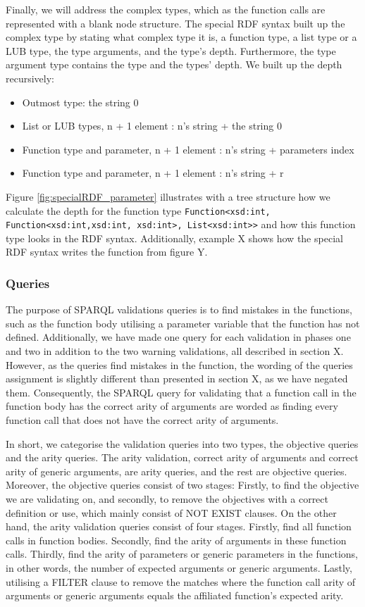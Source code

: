 \para
Finally, we will address the complex types, which as the function calls are represented with a blank node structure. The special RDF syntax built up the complex type by stating what complex type it is, a function type, a list type or a LUB type, the type arguments, and the type's depth. Furthermore, the type argument type contains the type and the types' depth. We built up the depth recursively:
\begin{itemize}
  \item Outmost type: the string 0
  \item List or LUB types, n + 1 element : n's string +  the string 0
  \item Function type and parameter, n + 1 element : n's string + parameters index 
  \item Function type and parameter, n + 1 element : n's string + r
\end{itemize}
Figure \ref{fig:specialRDF_parameter} illustrates with a tree structure how we calculate the depth for the function type \lstinline{Function<xsd:int, Function<xsd:int,xsd:int, xsd:int>, List<xsd:int>>} and how this function type looks in the RDF syntax. Additionally, example X shows how the special RDF syntax writes the function from figure Y. 


\subsubsection{Queries}
The purpose of SPARQL validations queries is to find mistakes in the functions, such as the function body utilising a parameter variable that the function has not defined. Additionally, we have made one query for each validation in phases one and two in addition to the two warning validations, all described in section X. However, as the queries find mistakes in the function, the wording of the queries assignment is slightly different than presented in section X, as we have negated them. Consequently, the SPARQL query for validating that a function call in the function body has the correct arity of arguments are worded as finding every function call that does not have the correct arity of arguments. 

\para
In short, we categorise the validation queries into two types, the objective queries and the arity queries. The arity validation, correct arity of arguments and correct arity of generic arguments, are arity queries, and the rest are objective queries. Moreover, the objective queries consist of two stages: Firstly, to find the objective we are validating on, and secondly, to remove the objectives with a correct definition or use, which mainly consist of NOT EXIST clauses. On the other hand, the arity validation queries consist of four stages. Firstly, find all function calls in function bodies. Secondly, find the arity of arguments in these function calls. Thirdly, find the arity of parameters or generic parameters in the functions, in other words, the number of expected arguments or generic arguments. Lastly, utilising a FILTER clause to remove the matches where the function call arity of arguments or generic arguments equals the affiliated function's expected arity.

